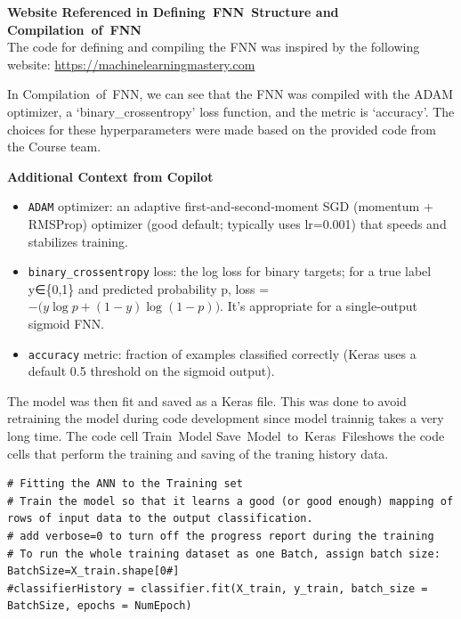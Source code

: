 \begin{framed}
\textbf{Website Referenced in Defining~FNN~Structure and Compilation~of~FNN}\\
The code for defining and compiling the FNN was inspired by the following website:
\href{https://machinelearningmastery.com}{https://machinelearningmastery.com}
\end{framed}

In Compilation~of~FNN, we can see that the FNN was compiled with the ADAM optimizer, a `binary\_crossentropy' loss function, and the metric is `accuracy'.  The choices for these hyperparameters were made based on the provided code from the Course team.

\begin{framed}
\textbf{Additional Context from Copilot}\\
\begin{itemize}
\item \texttt{ADAM} optimizer: an adaptive first‑and‑second‑moment SGD (momentum + RMSProp) optimizer (good default; typically uses lr=0.001) that speeds and stabilizes training.
\item \texttt{binary\_crossentropy} loss: the log loss for binary targets; for a true label y∈\{0,1\} and predicted probability p, loss = $- \big(y\log p + (1 -y)\log(1 -p)\big)$. It's appropriate for a single-output sigmoid FNN.
\item \texttt{accuracy} metric: fraction of examples classified correctly (Keras uses a default 0.5 threshold on the sigmoid output).
\end{itemize}
\end{framed}

The model was then fit and saved as a Keras file.  This was done to avoid retraining the model during code development since model trainnig takes a very long time. The code cell Train~Model Save~Model~to~Keras~Fileshows the code cells that perform the training and saving of the traning history data.

\begin{verbatim}
# Fitting the ANN to the Training set
# Train the model so that it learns a good (or good enough) mapping of rows of input data to the output classification.
# add verbose=0 to turn off the progress report during the training
# To run the whole training dataset as one Batch, assign batch size: BatchSize=X_train.shape[0#]
#classifierHistory = classifier.fit(X_train, y_train, batch_size = BatchSize, epochs = NumEpoch)
\end{verbatim}

